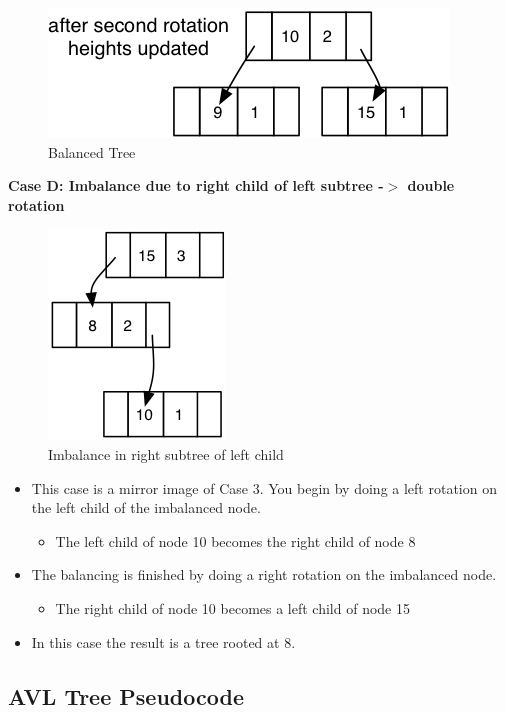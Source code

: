 \begin{figure}[H]
\centering
\includegraphics{pictures/tree21.png}
\caption{Balanced Tree}
\label{fig:tree21}
\end{figure}



\textbf{Case D: Imbalance due to right child of left subtree -$>$ double rotation}

\begin{figure}[H]
\centering
\includegraphics{pictures/tree22.png}
\caption{Imbalance in right subtree of left child}
\label{fig:tree22}
\end{figure}
\begin{itemize}
	\item This case is a mirror image of Case 3. You begin by doing a left rotation on the left child of the imbalanced node.
\begin{itemize}
	\item The left child of node 10 becomes the right child of node 8
\end{itemize}
	\item The balancing is finished by doing a right rotation on the imbalanced node.
\begin{itemize}
	\item The right child of node 10 becomes a left child of node 15
\end{itemize}
	\item In this case the result is a tree rooted at 8.
\end{itemize}



\subsection{AVL Tree Pseudocode}

